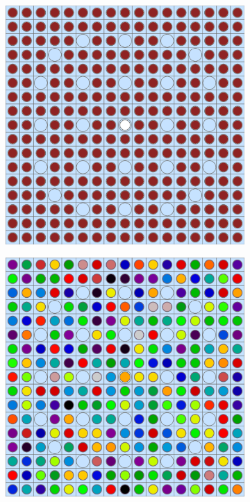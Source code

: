 \begin{figure}[h!]
\centering
\begin{subfigure}{.5\textwidth}
  \centering
  \includegraphics[width=0.8\linewidth]{figures/quantification/homogenization/assm-16-null-materials}
  \caption{}
  \label{fig:chap8-assm-16-null-materials}
\end{subfigure}%
\begin{subfigure}{.5\textwidth}
  \centering
  \includegraphics[width=0.8\linewidth]{figures/quantification/homogenization/assm-16-degenerate-materials}
  \caption{}
  \label{fig:chap8-assm-16-degenerate-materials}

\end{subfigure}
\end{figure}
